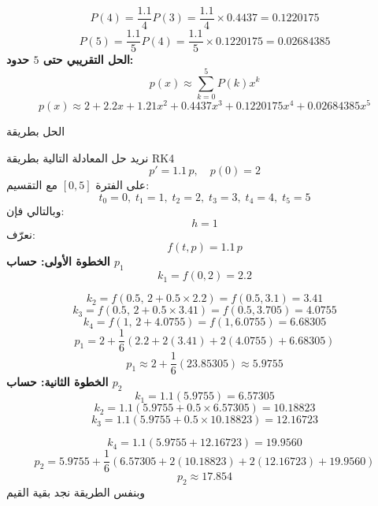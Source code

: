 		\begin{frame}
			\[
			P(4) = \frac{1.1}{4}P(3) = \frac{1.1}{4} \times 0.4437 = 0.1220175
			\]
			\[
			P(5) = \frac{1.1}{5}P(4) = \frac{1.1}{5} \times 0.1220175 = 0.02684385
			\]
			\textbf{الحل التقريبي حتى $5$ حدود:}
			\[
			p(x) \approx \sum_{k=0}^{5} P(k)x^k
			\]
			\[
			p(x) \approx 2 + 2.2x + 1.21x^2 + 0.4437x^3 + 0.1220175x^4 + 0.02684385x^5
			\]
		\end{frame}
		
		\begin{frame}{الحل بطريقة }
			
			نريد حل المعادلة التالية بطريقة RK4
			\[
			p' = 1.1\,p, \quad p(0)=2
			\]
			على الفترة \([0,5]\) مع التقسيم:
			\[
			t_0=0,\; t_1=1,\; t_2=2,\; t_3=3,\; t_4=4,\; t_5=5
			\]
			وبالتالي فإن:
			\[
			h = 1
			\]
			نعرّف:
			\[
			f(t,p) = 1.1\,p
			\]
			\textbf{الخطوة الأولى: حساب \( p_1 \)}
			\[
			k_1 = f(0,2) = 2.2
			\]
		\end{frame}
		
		\begin{frame}
			
			\[
			k_2 = f\left(0.5,\, 2 + 0.5 \times 2.2 \right) = f(0.5, 3.1) = 3.41
			\]
			\[
			k_3 = f\left(0.5,\, 2 + 0.5 \times 3.41 \right) = f(0.5, 3.705) = 4.0755
			\]
			\[
			k_4 = f(1,\, 2 + 4.0755) = f(1, 6.0755) = 6.68305
			\]
			\[
			p_1 = 2 + \frac{1}{6}(2.2 + 2(3.41) + 2(4.0755) + 6.68305)
			\]
			\[
			p_1 \approx 2 + \frac{1}{6}(23.85305) \approx 5.9755
			\]
			\textbf{الخطوة الثانية: حساب \( p_2 \)}
			\[
			k_1 = 1.1(5.9755) = 6.57305
			\]
			\[
			k_2 = 1.1(5.9755 + 0.5 \times 6.57305) = 10.18823
			\]
			\[
			k_3 = 1.1(5.9755 + 0.5 \times 10.18823) = 12.16723
			\]
		\end{frame}
		
		\begin{frame}
					\[
			k_4 = 1.1(5.9755 + 12.16723) = 19.9560
			\]
			\[
			p_2 = 5.9755 + \frac{1}{6}(6.57305 + 2(10.18823) + 2(12.16723) + 19.9560)
			\]
			\[
			p_2 \approx 17.854
			\]
			وبنفس الطريقة نجد بقية القيم
		\end{frame}
		
